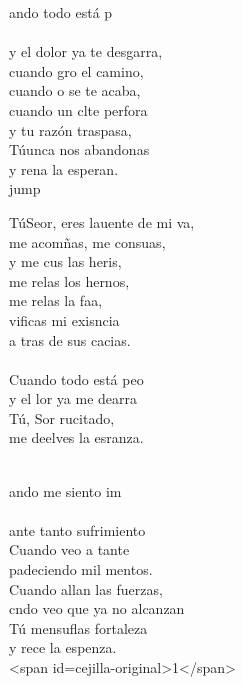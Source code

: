 \begin{cancion}%
	ando todo está p\\
	\jump\\
y el dolor ya te desgarra,\\
	cuando gro el camino, \\
	cuando o se te acaba,\\
	cuando un clte perfora \\
	y tu razón traspasa,\\
	Túunca nos abandonas \\
	y rena la esperan.\\jump\\
	\begin{chorus}%
	TúSeor, eres lauente de mi va, \\
	me acomñas, me consuas,\\
	y me cus las heris,\\
	me relas los hernos, \\
	me relas la faa,\\
	vificas mi exisncia\\
	a tras de sus cacias. \\
	\jump\\
	Cuando todo está peo\\
	y el lor ya me dearra\\
	Tú, Sor rucitado, \\
	me deelves la esranza.\\
	\end{chorus}%
	\jump\\
	ando me siento im\\
	\jump\\
ante tanto sufrimiento\\
	Cuando veo a tante\\
	padeciendo mil mentos.\\
	Cuando allan las fuerzas,\\
	cndo veo que ya no alcanzan\\
	Tú mensuflas fortaleza \\
	y rece la espenza.\\
<span id=cejilla-original>1</span>\\
\end{cancion}%
